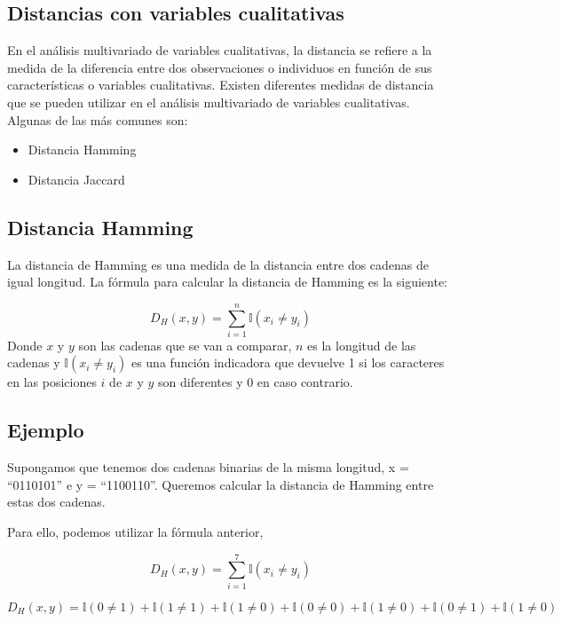 \documentclass[
]{article}
\begin{document}
\hypertarget{distancias-con-variables-cualitativas}{%
\subsection{Distancias con variables
cualitativas}\label{distancias-con-variables-cualitativas}}

En el análisis multivariado de variables cualitativas, la distancia se
refiere a la medida de la diferencia entre dos observaciones o
individuos en función de sus características o variables cualitativas.
Existen diferentes medidas de distancia que se pueden utilizar en el
análisis multivariado de variables cualitativas. Algunas de las más
comunes son:

\begin{itemize}
\item
  Distancia Hamming
\item
  Distancia Jaccard
\end{itemize}

\hypertarget{distancia-hamming}{%
\subsection{Distancia Hamming}\label{distancia-hamming}}

La distancia de Hamming es una medida de la distancia entre dos cadenas
de igual longitud. La fórmula para calcular la distancia de Hamming es
la siguiente:

\[ D_H(x, y) = \sum_{i=1}^{n} \mathbb{I}(x_i \neq y_i) \] Donde \(x\) y
\(y\) son las cadenas que se van a comparar, \(n\) es la longitud de las
cadenas y \(\mathbb{I}(x_i \neq y_i)\) es una función indicadora que
devuelve 1 si los caracteres en las posiciones \(i\) de \(x\) y \(y\)
son diferentes y 0 en caso contrario.

\hypertarget{ejemplo}{%
\subsection{Ejemplo}\label{ejemplo}}

Supongamos que tenemos dos cadenas binarias de la misma longitud, x =
``0110101'' e y = ``1100110''. Queremos calcular la distancia de Hamming
entre estas dos cadenas.

Para ello, podemos utilizar la fórmula anterior,

\[D_H(x, y) = \sum_{i=1}^7 \mathbb{I}(x_i \neq y_i)\]

\[D_H(x, y) = \mathbb{I}(0 \neq 1) + \mathbb{I}(1 \neq 1) + \mathbb{I}(1 \neq 0) + \mathbb{I}(0 \neq 0) + \mathbb{I}(1 \neq 0) + \mathbb{I}(0 \neq 1) + \mathbb{I}(1 \neq 0)\]
\end{document}
